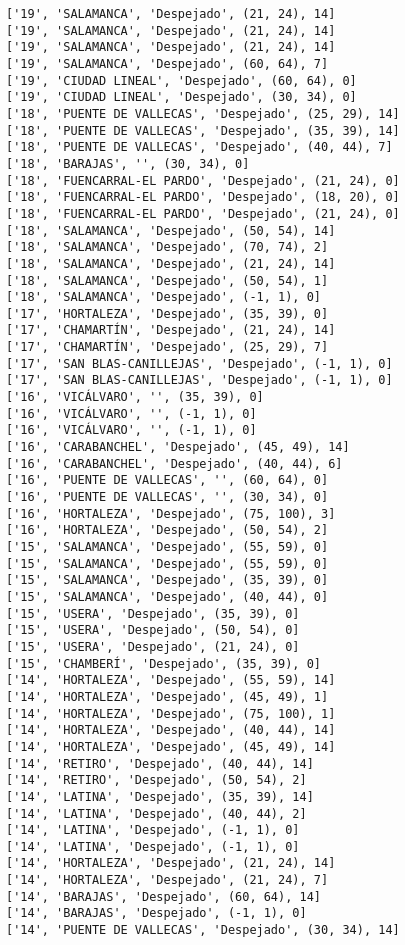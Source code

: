 \documentclass[11pt]{article}
\begin{document}
\begin{Verbatim}[commandchars=\\\{\}]
['19', 'SALAMANCA', 'Despejado', (21, 24), 14]
['19', 'SALAMANCA', 'Despejado', (21, 24), 14]
['19', 'SALAMANCA', 'Despejado', (21, 24), 14]
['19', 'SALAMANCA', 'Despejado', (60, 64), 7]
['19', 'CIUDAD LINEAL', 'Despejado', (60, 64), 0]
['19', 'CIUDAD LINEAL', 'Despejado', (30, 34), 0]
['18', 'PUENTE DE VALLECAS', 'Despejado', (25, 29), 14]
['18', 'PUENTE DE VALLECAS', 'Despejado', (35, 39), 14]
['18', 'PUENTE DE VALLECAS', 'Despejado', (40, 44), 7]
['18', 'BARAJAS', '', (30, 34), 0]
['18', 'FUENCARRAL-EL PARDO', 'Despejado', (21, 24), 0]
['18', 'FUENCARRAL-EL PARDO', 'Despejado', (18, 20), 0]
['18', 'FUENCARRAL-EL PARDO', 'Despejado', (21, 24), 0]
['18', 'SALAMANCA', 'Despejado', (50, 54), 14]
['18', 'SALAMANCA', 'Despejado', (70, 74), 2]
['18', 'SALAMANCA', 'Despejado', (21, 24), 14]
['18', 'SALAMANCA', 'Despejado', (50, 54), 1]
['18', 'SALAMANCA', 'Despejado', (-1, 1), 0]
['17', 'HORTALEZA', 'Despejado', (35, 39), 0]
['17', 'CHAMARTÍN', 'Despejado', (21, 24), 14]
['17', 'CHAMARTÍN', 'Despejado', (25, 29), 7]
['17', 'SAN BLAS-CANILLEJAS', 'Despejado', (-1, 1), 0]
['17', 'SAN BLAS-CANILLEJAS', 'Despejado', (-1, 1), 0]
['16', 'VICÁLVARO', '', (35, 39), 0]
['16', 'VICÁLVARO', '', (-1, 1), 0]
['16', 'VICÁLVARO', '', (-1, 1), 0]
['16', 'CARABANCHEL', 'Despejado', (45, 49), 14]
['16', 'CARABANCHEL', 'Despejado', (40, 44), 6]
['16', 'PUENTE DE VALLECAS', '', (60, 64), 0]
['16', 'PUENTE DE VALLECAS', '', (30, 34), 0]
['16', 'HORTALEZA', 'Despejado', (75, 100), 3]
['16', 'HORTALEZA', 'Despejado', (50, 54), 2]
['15', 'SALAMANCA', 'Despejado', (55, 59), 0]
['15', 'SALAMANCA', 'Despejado', (55, 59), 0]
['15', 'SALAMANCA', 'Despejado', (35, 39), 0]
['15', 'SALAMANCA', 'Despejado', (40, 44), 0]
['15', 'USERA', 'Despejado', (35, 39), 0]
['15', 'USERA', 'Despejado', (50, 54), 0]
['15', 'USERA', 'Despejado', (21, 24), 0]
['15', 'CHAMBERÍ', 'Despejado', (35, 39), 0]
['14', 'HORTALEZA', 'Despejado', (55, 59), 14]
['14', 'HORTALEZA', 'Despejado', (45, 49), 1]
['14', 'HORTALEZA', 'Despejado', (75, 100), 1]
['14', 'HORTALEZA', 'Despejado', (40, 44), 14]
['14', 'HORTALEZA', 'Despejado', (45, 49), 14]
['14', 'RETIRO', 'Despejado', (40, 44), 14]
['14', 'RETIRO', 'Despejado', (50, 54), 2]
['14', 'LATINA', 'Despejado', (35, 39), 14]
['14', 'LATINA', 'Despejado', (40, 44), 2]
['14', 'LATINA', 'Despejado', (-1, 1), 0]
['14', 'LATINA', 'Despejado', (-1, 1), 0]
['14', 'HORTALEZA', 'Despejado', (21, 24), 14]
['14', 'HORTALEZA', 'Despejado', (21, 24), 7]
['14', 'BARAJAS', 'Despejado', (60, 64), 14]
['14', 'BARAJAS', 'Despejado', (-1, 1), 0]
['14', 'PUENTE DE VALLECAS', 'Despejado', (30, 34), 14]

\end{Verbatim}
\end{document}
